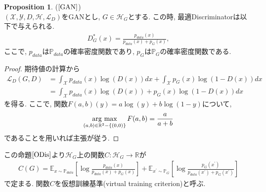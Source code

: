 \documentclass[11pt, a4paper, dvipdfmx]{jsarticle}
\theoremstyle{definition}
\newtheorem{Proposition+}[Axiom+]{Proposition}
\newcommand{\R}{\mathbb{R}}
\newcommand{\X}{\mathcal{X}}
\newcommand{\Y}{\mathcal{Y}}
\newcommand{\Hil}{\mathcal{H}}
\newcommand{\Loss}{\mathcal{L}_{D}}
\newcommand{\MLsp}{(\X, \Y, D, \Hil, \Loss)}
\newcommand{\argmax}{\mathop{\rm arg~max}\limits}
\begin{document}
\begin{Proposition+}($\cite{GAN}$)\label{ODis}\\
    $\MLsp$をGANとし, $G\in\Hil_{G}$とする. この時, 最適Discriminatorは以下で与えられる.
    \begin{align*}
        D_{G}^{*}(x) = \frac{p_{data}(x)}{p_{data}(x) + p_{G}(x)},
    \end{align*}
    ここで, $p_{data}$は$\mathbb{P}_{data}$の確率密度関数であり, $p_{G}$は$\mathbb{P}_{G}$の確率密度関数である.
\begin{proof}
    期待値の計算から
    \begin{align*}
        \Loss(G, D) &= \int_{\X}p_{data}(x)\log(D(x))dx + \int_{\X}p_{G}(x)\log(1 - D(x))dx\\
                    &= \int_{\X}p_{data}(x)\log(D(x)) + p_{G}(x)\log(1 - D(x))dx
    \end{align*}
    を得る. ここで, 関数$F(a, b)(y) = a\log(y) + b\log(1 - y)$について, 
    \begin{align*}
        \argmax_{(a, b)\in\R^{2}- \{(0, 0)\}}F(a, b)= \frac{a}{a + b}
    \end{align*}
    であることを用いれば主張が従う.
\end{proof}
\end{Proposition+}
この命題$\ref{ODis}$より$\Hil_{G}$上の関数$C:\Hil_{G}\to\R$が
\begin{align*}
    C(G) = \mathbb{E}_{x\sim\mathbb{P}_{data}}\left[ \log\frac{p_{data}(x)}{p_{data}(x) + p_{G}(x)} \right] + \mathbb{E}_{x^{\prime}\sim\mathbb{P}_{G}}\left[ \log\frac{p_{G}(x^{\prime})}{p_{data}(x^{\prime}) + p_{G}(x^{\prime})} \right]
\end{align*}
で定まる. 関数$C$を仮想訓練基準(virtual training criterion)と呼ぶ. 
\end{document}
